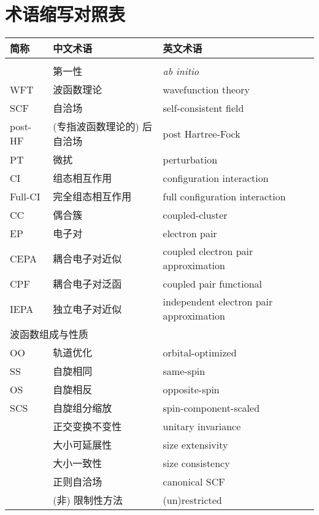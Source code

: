 
\chapter{术语缩写对照表}

\begingroup
\setlength{\LTleft}{-20cm plus -1fill}
\setlength{\LTright}{\LTleft}

\begin{longtable}{lll}
    \toprule 简称 & 中文术语 & 英文术语 \\ \midrule \endhead
    \bottomrule \endlastfoot
    \multicolumn{3}{l}{\textsf{波函数理论}} \\
    & 第一性 & \emph{ab initio} \\
    WFT & 波函数理论 & wavefunction theory \\
    SCF & 自洽场 & self-consistent field \\
    post-HF & (专指波函数理论的) 后自洽场 & post Hartree-Fock \\
    PT & 微扰 & perturbation \\
    CI & 组态相互作用 & configuration interaction \\
    Full-CI & 完全组态相互作用 & full configuration interaction \\
    CC & 偶合簇 & coupled-cluster \\
    EP & 电子对 & electron pair \\
    CEPA & 耦合电子对近似 & coupled electron pair approximation \\
    CPF & 耦合电子对泛函 & coupled pair functional \\
    IEPA & 独立电子对近似 & independent electron pair approximation \\
    \midrule
    \multicolumn{3}{l}{\textsf{波函数组成与性质}} \\
    OO & 轨道优化 & orbital-optimized \\
    SS & 自旋相同 & same-spin \\
    OS & 自旋相反 & opposite-spin \\
    SCS & 自旋组分缩放 & spin-component-scaled \\
    & 正交变换不变性 & unitary invariance \\
    & 大小可延展性 & size extensivity \\
    & 大小一致性 & size consistency \\
    & 正则自洽场 & canonical SCF \\
    & (非) 限制性方法 & (un)restricted \\

\end{longtable}
